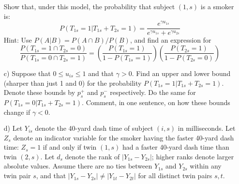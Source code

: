 \documentclass{article}
\begin{document}
\begin{itemize}
          Show that, under this model, the probability
          that subject $(1,s)$ is a smoker is:
          \begin{equation}
            P(T_{1s} = 1| T_{1s} + T_{2s} = 1) 
            = \frac{e^{\gamma u_{1s}}}{e^{\gamma u_{1s}} + e^{\gamma u_{2s}}}
            \label{aprobques}
          \end{equation}
          Hint: Use $P(A | B) = P(A\cap B)/P(B)$, and find an expression for
          $$
            \frac{P(T_{1s} = 1 \cap T_{2s} = 0)}{P(T_{1s} = 0 \cap T_{2s} = 1)} = 
            \left(\frac{P(T_{1s} = 1)}{1 - P(T_{1s} = 1)}\right)
            \left(\frac{P(T_{2s} = 1)}{1 - P(T_{2s} = 0)}\right)
          $$
        \item[c)]
          Suppose that $0 \leq u_{is} \leq 1$ and that $\gamma > 0$.
          Find an upper and lower bound (sharper than just 1 and 0) for the probability
          $P(T_{1s} = 1| T_{1s} + T_{2s} = 1).$
          Denote these bounds by $p^+_s$ and $p^-_s$ respectively.
          Do the same for $P(T_{1s} = 0| T_{1s} + T_{2s} = 1).$
          Comment, in one sentence, on how these bounds change if $\gamma < 0$.
        \item[d)]
          Let $Y_{is}$ denote the 40-yard dash time of subject $(i,s)$ in milliseconds.
          Let $Z_s$ denote an indicator variable for the smoker having the faster 40-yard dash time:
          $Z_s = 1$ if and only if twin $(1,s)$ had a faster 40-yard dash time than twin $(2,s)$.
          Let $d_s$ denote the rank of $|Y_{1s} - Y_{2s}|$; higher ranks denote larger absolute values.
          Assume there are no ties between $Y_{1s}$ and $Y_{2s}$ within any 
          twin pair $s$,
          and that $|Y_{1s} - Y_{2s}| \neq |Y_{1t} - Y_{2t}|$ for all distinct twin pairs $s,t$.
          

\end{itemize}
\end{document}

